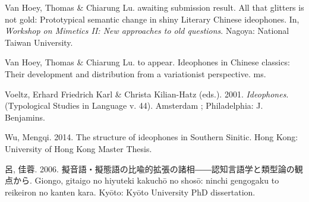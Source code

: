 \documentclass[12pt,]{article}
\theoremstyle{definition}
\theoremstyle{definition}
\theoremstyle{definition}
\theoremstyle{remark}
\begin{document}
\hypertarget{ref-VanHoeyawaitingsubmissionresult}{}
Van Hoey, Thomas \& Chiarung Lu. awaiting submission result. All that
glitters is not gold: Prototypical semantic change in shiny Literary
Chinese ideophones. In, \emph{Workshop on Mimetics II: New approaches to
old questions}. Nagoya: National Taiwan University.

\hypertarget{ref-VanHoeytoappear}{}
Van Hoey, Thomas \& Chiarung Lu. to appear. Ideophones in Chinese
classics: Their development and distribution from a variationist
perspective. ms.

\hypertarget{ref-Voeltz2001}{}
Voeltz, Erhard Friedrich Karl \& Christa Kilian-Hatz (eds.). 2001.
\emph{Ideophones}. (Typological Studies in Language v. 44). Amsterdam ;
Philadelphia: J. Benjamins.

\hypertarget{ref-Wu2014}{}
Wu, Mengqi. 2014. The structure of ideophones in Southern Sinitic. Hong
Kong: University of Hong Kong Master Thesis.

\hypertarget{ref-Lu2006}{}
呂, 佳蓉. 2006.
擬音語・擬態語の比喩的拡張の諸相――認知言語学と類型論の観点から. Giongo,
gitaigo no hiyuteki kakuchō no shosō: ninchi gengogaku to reikeiron no
kanten kara. Kyōto: Kyōto University PhD dissertation.
\end{document}
